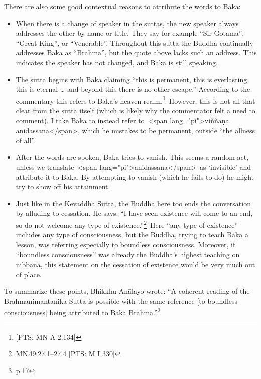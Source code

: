 \documentclass[10pt, openright]{book}
\begin{document}
There are also some good contextual reasons to attribute the words to Baka:


\begin{itemize}

\itemsep5pt\parskip0pt


\item
When there is a change of speaker in the suttas, the new speaker always addresses the other by name or title. They say for example “Sir Gotama”, “Great King”, or “Venerable”. Throughout this sutta the Buddha continually addresses Baka as “Brahmā”, but the quote above lacks such an address. This indicates the speaker has not changed, and Baka is still speaking.



\item
The sutta begins with Baka claiming “this is permanent, this is everlasting, this is eternal … and beyond this there is no other escape.” According to the commentary this refers to Baka’s heaven realm.\footnote {[PTS: MN-A 2.134]} However, this is not all that clear from the sutta itself (which is likely why the commentator felt a need to comment). I take Baka to instead refer to <span lang="pi">viññāṇa anidassana</span>, which he mistakes to be permanent, outside “the allness of all”.



\item
After the words are spoken, Baka tries to vanish. This seems a random act, unless we translate <span lang="pi">anidassana</span> as ‘invisible’ and attribute it to Baka. By attempting to vanish (which he fails to do) he might try to show off his attainment.



\item
Just like in the Kevaddha Sutta, the Buddha here too ends the conversation by alluding to cessation. He says: “I have seen existence will come to an end, so do not welcome any type of existence.”\footnote {\href{https://suttacentral.net/mn49/en/sujato\#27.1}{MN 49:27.1–27.4} [PTS: M I 330]} Here “any type of existence” includes any type of consciousness, but the Buddha, trying to teach Baka a lesson, was referring especially to boundless consciousness. Moreover, if “boundless consciousness” was already the Buddha’s highest teaching on nibbāna, this statement on the cessation of existence would be very much out of place.





\end{itemize}
To summarize these points, Bhikkhu Anālayo wrote: “A coherent reading of the Brahmanimantanika Sutta is possible with the same reference [to boundless consciousness] being attributed to Baka Brahmā.”\footnote {\cite{Anālayo 2017} p.17}
\end{document}

